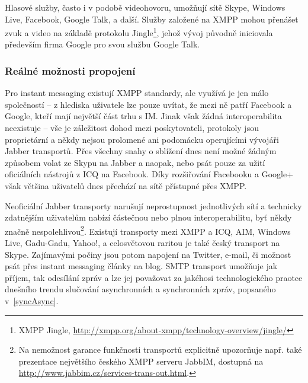\documentclass[12pt,oneside,final]{fithesis2}
\begin{document}
Hlasové služby, často i v podobě videohovoru, umožňují sítě Skype, Windows Live, Facebook, Google Talk, a další. Služby založené na XMPP mohou přenášet zvuk a video na základě protokolu Jingle\footnote{XMPP Jingle, \url{http://xmpp.org/about-xmpp/technology-overview/jingle/}}, jehož vývoj původně iniciovala především firma Google pro svou službu Google Talk.

\subsubsection*{Reálné možnosti propojení}
Pro instant messaging existují XMPP standardy, ale využívá je jen málo společností -- z hlediska uživatele lze pouze uvítat, že mezi ně patří Facebook a Google, kteří mají největší část trhu s IM. Jinak však žádná interoperabilita neexistuje -- vše je záležitost dohod mezi poskytovateli, protokoly jsou proprietární a někdy nejsou prolomené ani podomácku operujícími vývojáři Jabber transportů. Přes všechny snahy o sblížení dnes není možné žádným způsobem volat ze Skypu na Jabber a naopak, nebo psát pouze za užití oficiálních nástrojů z ICQ na Facebook. Díky rozšiřování Facebooku a Google+ však většina uživatelů dnes přechází na sítě přístupné přes XMPP.

Neoficiální Jabber transporty narušují neprostupnost jednotlivých sítí a technicky zdatnějším uživatelům nabízí částečnou nebo plnou interoperabilitu, byť někdy značně nespolehlivou\footnote{Na nemožnost garance funkčnosti transportů explicitně upozorňuje např. také prezentace největšího českého XMPP serveru JabbIM, dostupná na \url{http://www.jabbim.cz/services-trans-out.html}.}. Existují transporty mezi XMPP a ICQ, AIM, Windows Live, Gadu-Gadu, Yahoo!, a celosvětovou raritou je také český transport na Skype. Zajímavými počiny jsou potom napojení na Twitter, e-mail, či možnost psát přes instant messaging články na blog. SMTP transport umožňuje jak příjem, tak odesílání zpráv a lze jej považovat za jakéhosi technologického praotce dnešního trendu slučování asynchronních a synchronních zpráv, popsaného v~\ref{syncAsync}.
\end{document}
